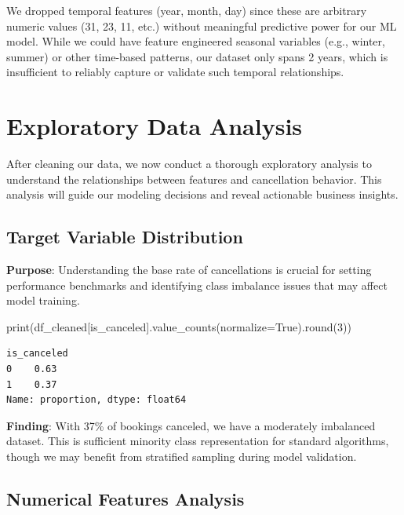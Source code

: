 \documentclass[
  letterpaper,
  DIV=11,
  numbers=noendperiod]{scrartcl}
\newenvironment{Shaded}{\begin{snugshade}}{\end{snugshade}}
\newcommand{\BuiltInTok}[1]{\textcolor[rgb]{0.00,0.23,0.31}{#1}}
\newcommand{\DecValTok}[1]{\textcolor[rgb]{0.68,0.00,0.00}{#1}}
\newcommand{\NormalTok}[1]{\textcolor[rgb]{0.00,0.23,0.31}{#1}}
\newcommand{\OperatorTok}[1]{\textcolor[rgb]{0.37,0.37,0.37}{#1}}
\newcommand{\StringTok}[1]{\textcolor[rgb]{0.13,0.47,0.30}{#1}}
\newcommand{\VariableTok}[1]{\textcolor[rgb]{0.07,0.07,0.07}{#1}}
\renewenvironment{Shaded}{%
  \begin{tcolorbox}[%
    enhanced,%
    colback=codebg,%
    colframe=codebg,%
    borderline west={3pt}{0pt}{sectionblue},%
    fontupper=\small\ttfamily,%
    boxrule=0pt,%
    arc=0pt,%
    boxsep=5pt,%
    left=2mm,%
    right=2mm,%
    top=2mm,%
    bottom=2mm%
  ]%
}{%
  \end{tcolorbox}%
}
\begin{document}
We dropped temporal features (year, month, day) since these are
arbitrary numeric values (31, 23, 11, etc.) without meaningful
predictive power for our ML model. While we could have feature
engineered seasonal variables (e.g., winter, summer) or other time-based
patterns, our dataset only spans 2 years, which is insufficient to
reliably capture or validate such temporal relationships.

\section{Exploratory Data Analysis}\label{exploratory-data-analysis}

After cleaning our data, we now conduct a thorough exploratory analysis
to understand the relationships between features and cancellation
behavior. This analysis will guide our modeling decisions and reveal
actionable business insights.

\subsection{Target Variable
Distribution}\label{target-variable-distribution}

\textbf{Purpose}: Understanding the base rate of cancellations is
crucial for setting performance benchmarks and identifying class
imbalance issues that may affect model training.

\begin{Shaded}
\begin{Highlighting}[]
\BuiltInTok{print}\NormalTok{(df\_cleaned[}\StringTok{\textquotesingle{}is\_canceled\textquotesingle{}}\NormalTok{].value\_counts(normalize}\OperatorTok{=}\VariableTok{True}\NormalTok{).}\BuiltInTok{round}\NormalTok{(}\DecValTok{3}\NormalTok{))}
\end{Highlighting}
\end{Shaded}

\begin{verbatim}
is_canceled
0    0.63
1    0.37
Name: proportion, dtype: float64
\end{verbatim}

\textbf{Finding}: With 37\% of bookings canceled, we have a moderately
imbalanced dataset. This is sufficient minority class representation for
standard algorithms, though we may benefit from stratified sampling
during model validation.

\subsection{Numerical Features
Analysis}\label{numerical-features-analysis}
\end{document}
